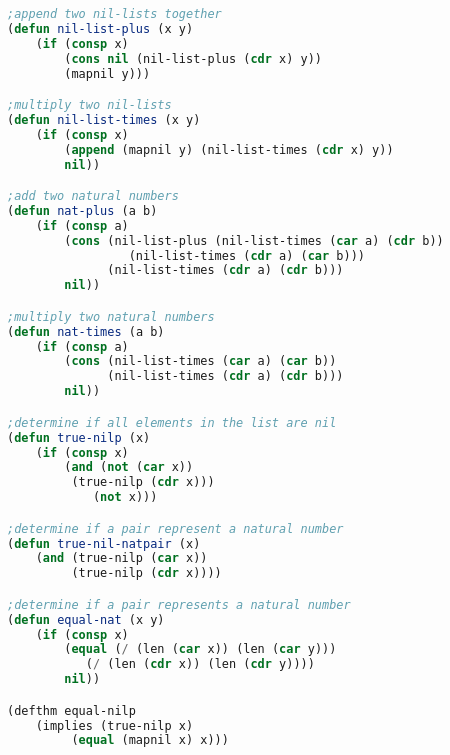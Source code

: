 \documentclass[landscape]{slides}
\begin{document}
\begin{lstlisting}[language=Lisp,breaklines=true]
;append two nil-lists together
(defun nil-list-plus (x y)
	(if (consp x)
	    (cons nil (nil-list-plus (cdr x) y))
	    (mapnil y)))

;multiply two nil-lists
(defun nil-list-times (x y)
	(if (consp x)
	    (append (mapnil y) (nil-list-times (cdr x) y))
	    nil))

;add two natural numbers
(defun nat-plus (a b)
	(if (consp a)
	    (cons (nil-list-plus (nil-list-times (car a) (cdr b))
				 (nil-list-times (cdr a) (car b)))
	          (nil-list-times (cdr a) (cdr b)))
	    nil))

;multiply two natural numbers
(defun nat-times (a b)
	(if (consp a)
	    (cons (nil-list-times (car a) (car b))
	          (nil-list-times (cdr a) (cdr b)))
	    nil))

;determine if all elements in the list are nil
(defun true-nilp (x)
	(if (consp x)
	    (and (not (car x))
		 (true-nilp (cdr x)))
            (not x)))

;determine if a pair represent a natural number
(defun true-nil-natpair (x)
	(and (true-nilp (car x))
	     (true-nilp (cdr x))))

;determine if a pair represents a natural number
(defun equal-nat (x y)
	(if (consp x)
	    (equal (/ (len (car x)) (len (car y)))
		   (/ (len (cdr x)) (len (cdr y))))
	    nil))

(defthm equal-nilp
	(implies (true-nilp x)
		 (equal (mapnil x) x)))
\end{lstlisting}
\end{document}
